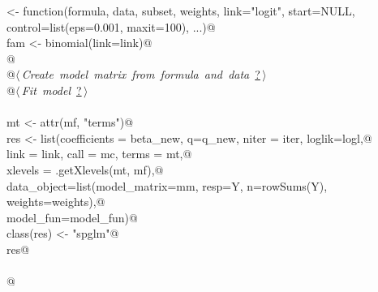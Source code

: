 \documentclass[reqno]{amsart}
\renewcommand{\NWlink}[2]{\hyperlink{#1}{#2}}
\begin{document}
\begin{flushleft}
\begin{list}{}{}
\mbox{}\verb@spglm <- function(formula, data, subset, weights, link="logit", start=NULL, control=list(eps=0.001, maxit=100), ...){@\\
\mbox{}\verb@    fam <- binomial(link=link)@\\
\mbox{}\verb@    @\\
\mbox{}\verb@    @\hbox{$\langle\,${\itshape Create model matrix from formula and data}\nobreak\ {\footnotesize \NWlink{nuweb?}{?}}$\,\rangle$}\verb@@\\
\mbox{}\verb@    @\hbox{$\langle\,${\itshape Fit model}\nobreak\ {\footnotesize \NWlink{nuweb?}{?}}$\,\rangle$}\verb@@\\
\mbox{}\verb@@\\
\mbox{}\verb@    mt <- attr(mf, "terms")@\\
\mbox{}\verb@    res <- list(coefficients = beta_new, q=q_new, niter = iter, loglik=logl,@\\
\mbox{}\verb@                link = link, call = mc, terms = mt,@\\
\mbox{}\verb@                xlevels = .getXlevels(mt, mf),@\\
\mbox{}\verb@                data_object=list(model_matrix=mm, resp=Y, n=rowSums(Y), weights=weights),@\\
\mbox{}\verb@                model_fun=model_fun)@\\
\mbox{}\verb@    class(res) <- "spglm"@\\
\mbox{}\verb@    res@\\
\mbox{}\verb@@\\
\mbox{}\verb@}@\\
\mbox{}\verb@@{\NWsep}
\end{list}
\vspace{-1.5ex}
\footnotesize
\begin{list}{}{\setlength{\itemsep}{-\parsep}\setlength{\itemindent}{-\leftmargin}}

\item{}
\end{list}
\vspace{4ex}
\end{flushleft}
\end{document}
